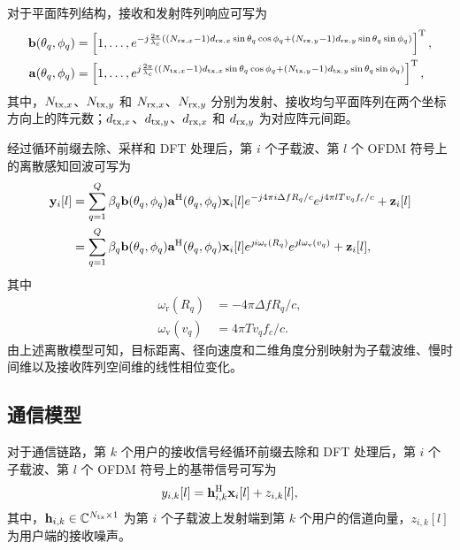 \documentclass[onecolumn,10pt]{IEEEtran}
\begin{document}
对于平面阵列结构，接收和发射阵列响应可写为
\begin{align}
\mathbf{b}(\theta_q,\phi_q) &= \left[ 1,
\ldots,
e^{-j\frac{2\pi}{\lambda_c}
\left(
(N_{{\rm rx},x}-1)d_{{\rm rx},x}\sin\theta_q\cos\phi_q
+
(N_{{\rm rx},y}-1)d_{{\rm rx},y}\sin\theta_q\sin\phi_q
\right)} \right]^{\rm T},\\
\mathbf{a}(\theta_q,\phi_q) &= \left[ 1, 
\ldots,
e^{j\frac{2\pi}{\lambda_c}
\left(
(N_{{\rm tx},x}-1)d_{{\rm tx},x}\sin\theta_q\cos\phi_q
+
(N_{{\rm tx},y}-1)d_{{\rm tx},y}\sin\theta_q\sin\phi_q
\right)} \right]^{\rm T},
\end{align} 
其中，$N_{{\rm tx},x}$、$N_{{\rm tx},y}$ 和 $N_{{\rm rx},x}$、$N_{{\rm rx},y}$ 分别为发射、接收均匀平面阵列在两个坐标方向上的阵元数；$d_{{\rm tx},x}$、$d_{{\rm tx},y}$、$d_{{\rm rx},x}$ 和 $d_{{\rm rx},y}$ 为对应阵元间距。

经过循环前缀去除、采样和 DFT 处理后，第 $i$ 个子载波、第 $l$ 个 OFDM 符号上的离散感知回波可写为
\begin{align}
 {\mathbf{y}}_i[l]  
 &= \sum_{q=1}^{Q} \beta_q \mathbf{b}(\theta_q,\phi_q) \mathbf{a}^{\rm H}(\theta_q,\phi_q)  \mathbf{x}_i[l]  
 e^{-j4\pi i \Delta f  R_q /c} e^{j4\pi lTv_qf_c /c} + {\mathbf{z}}_i[l] \\
 &= \sum_{q=1}^{Q} \beta_q \mathbf{b}(\theta_q,\phi_q) \mathbf{a}^{\rm H}(\theta_q,\phi_q)  \mathbf{x}_i[l]   
e^{\jmath i\omega_\mathrm{r}(R_q)}
e^{\jmath l\omega_\mathrm{v}(v_q)} + {\mathbf{z}} _i[l],
\end{align}
其中
\begin{align}
    \omega_\mathrm{r}(R_q)&= -4\pi \Delta f  R_q /c,\\
    \omega_\mathrm{v}(v_q) &= 4\pi T  v_q f_c /c.
\end{align}
由上述离散模型可知，目标距离、径向速度和二维角度分别映射为子载波维、慢时间维以及接收阵列空间维的线性相位变化。


\subsection{通信模型}
对于通信链路，第 $k$ 个用户的接收信号经循环前缀去除和 DFT 处理后，第 $i$ 个子载波、第 $l$ 个 OFDM 符号上的基带信号可写为
\begin{align}
    y_{i,k}[l]
    =
    \mathbf{h}_{i,k}^{\rm H}\mathbf{x}_i[l]
    +
    z_{i,k}[l],
\end{align}
其中，$\mathbf{h}_{i,k}\in\mathbb{C}^{N_{\rm tx}\times 1}$ 为第 $i$ 个子载波上发射端到第 $k$ 个用户的信道向量，$z_{i,k}[l]$ 为用户端的接收噪声。
\end{document}
